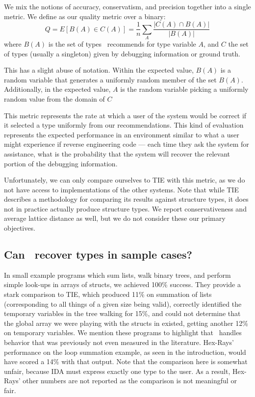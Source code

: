 We mix the notions of accuracy, conservatism, and precision together into a single metric. We define as our quality metric over a binary:
\[
Q = E[B(A) \in C(A)] = \frac{1}{n}\sum_{A} \frac{|C(A) \cap B(A)|}{|B(A)|}
\]
where $B(A)$ is the set of types \bitr\ recommends for type variable $A$, and $C$ the set of types (usually a singleton) given by debugging information or ground truth.

This has a slight abuse of notation. Within the expected value, $B(A)$ is a random variable that generates a uniformly random member of the set $B(A)$. Additionally, in the expected value, $A$ is the random variable picking a uniformly random value from the domain of $C$

This metric represents the rate at which a user of the system would be correct if it selected a type uniformly from our recommendations. This kind of evaluation represents the expected performance in an environment similar to what a user might experience if reverse engineering code --- each time they ask the system for assistance, what is the probability that the system will recover the relevant portion of the debugging information.

Unfortunately, we can only compare ourselves to TIE with this metric, as we do not have access to implementations of the other systems. Note that while TIE describes a methodology for comparing its results against structure types, it does not in practice actually produce structure types. We report conservativeness and average lattice distance as well, but we do not consider these our primary objectives.

\subsection{Can \bitr\ recover types in sample cases?}
In small example programs which sum lists, walk binary trees, and perform simple look-ups in arrays of structs, we achieved 100\% success. They provide a stark comparison to TIE, which produced 11\% on summation of lists (corresponding to all things of a given size being valid), correctly identified the temporary variables in the tree walking for 15\%, and could not determine that the global array we were playing with the structs in existed, getting another 12\% on temporary variables. We mention these programs to highlight that \bitr\ handles behavior that was previously not even measured in the literature. Hex-Rays'~\cite{ida} performance on the loop summation example, as seen in the introduction, would have scored a 14\% with that output. Note that the comparison here is somewhat unfair, because IDA must express exactly one type to the user. As a result, Hex-Rays' other numbers are not reported as the comparison is not meaningful or fair.

